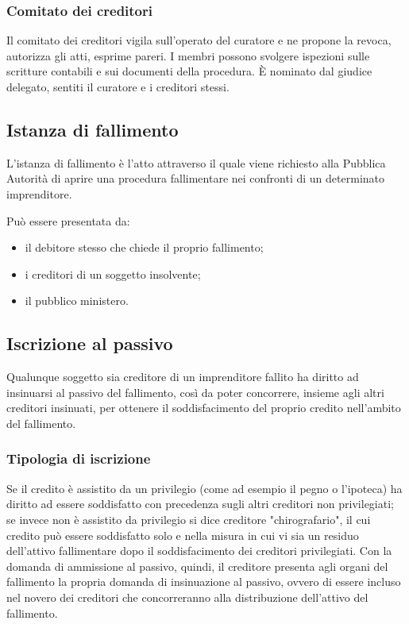 \subsubsection{Comitato dei creditori}
Il comitato dei creditori vigila sull'operato del curatore e ne propone la revoca, autorizza gli atti, esprime pareri.
I membri possono svolgere ispezioni sulle scritture contabili e sui documenti della procedura. È nominato dal giudice delegato, sentiti il curatore e i creditori stessi.


\subsection{Istanza di fallimento}
L’istanza di fallimento è l’atto attraverso il quale viene richiesto alla Pubblica Autorità di aprire una procedura fallimentare nei confronti di un determinato imprenditore.

Può essere presentata da:
\begin{itemize}
\item il debitore stesso che chiede il proprio fallimento; 
\item i creditori di un soggetto insolvente; 
\item il pubblico ministero. 
\end{itemize}

\subsection{Iscrizione al passivo}
Qualunque soggetto sia creditore di un imprenditore fallito ha diritto ad insinuarsi al passivo del fallimento, così da poter concorrere, insieme agli altri creditori insinuati, per ottenere il soddisfacimento del proprio credito nell'ambito del fallimento.

\subsubsection{Tipologia di iscrizione}
Se il credito è assistito da un privilegio (come ad esempio il pegno o l’ipoteca) ha diritto ad essere soddisfatto con precedenza sugli altri creditori non privilegiati; se invece non è assistito da privilegio si dice creditore "chirografario", il cui credito può essere soddisfatto solo e nella misura in cui vi sia un residuo dell'attivo fallimentare dopo il soddisfacimento dei creditori privilegiati. 
Con la domanda di ammissione al passivo, quindi, il creditore presenta agli organi del fallimento la propria domanda di insinuazione al passivo, ovvero di essere incluso nel novero dei creditori che concorreranno alla distribuzione dell'attivo del fallimento.

